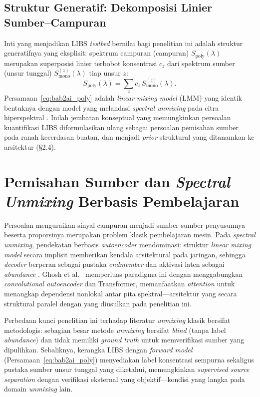 \subsection{Struktur Generatif: Dekomposisi Linier Sumber--Campuran}
Inti yang menjadikan LIBS \textit{testbed} bernilai bagi penelitian ini adalah struktur generatifnya yang eksplisit: spektrum campuran (campuran) $S_{\mathrm{poly}}(\lambda)$ merupakan superposisi linier terbobot konsentrasi $c_z$ dari spektrum sumber (unsur tunggal) $S_{\mathrm{mono}}^{(z)}(\lambda)$ tiap unsur $z$:
\begin{equation} \label{eq:bab2ai_poly}
S_{\mathrm{poly}}(\lambda) = \sum_{z} c_z \, S_{\mathrm{mono}}^{(z)}(\lambda).
\end{equation}
Persamaan~\ref{eq:bab2ai_poly} adalah \textit{linear mixing model} (LMM) yang identik bentuknya dengan model yang melandasi \textit{spectral unmixing} pada citra hiperspektral \citep{palsson_hyperspectral_2018, ghosh_hyperspectral_2022}. Inilah jembatan konseptual yang memungkinkan persoalan kuantifikasi LIBS diformulasikan ulang sebagai persoalan pemisahan sumber pada ranah kecerdasan buatan, dan menjadi \textit{prior} struktural yang ditanamkan ke arsitektur (§2.4).

\section{Pemisahan Sumber dan \textit{Spectral Unmixing} Berbasis Pembelajaran}

Persoalan menguraikan sinyal campuran menjadi sumber-sumber penyusunnya beserta proporsinya merupakan problem klasik pembelajaran mesin. Pada \textit{spectral unmixing}, pendekatan berbasis \textit{autoencoder} mendominasi: struktur \textit{linear mixing model} secara implisit memberikan kendala arsitektural pada jaringan, sehingga \textit{decoder} berperan sebagai pustaka \textit{endmember} dan aktivasi laten sebagai \textit{abundance} \citep{palsson_hyperspectral_2018}. Ghosh et al.\ \citep{ghosh_hyperspectral_2022} memperluas paradigma ini dengan menggabungkan \textit{convolutional autoencoder} dan Transformer, memanfaatkan \textit{attention} untuk menangkap dependensi nonlokal antar pita spektral---arsitektur yang secara struktural paralel dengan yang diusulkan pada penelitian ini.

Perbedaan kunci penelitian ini terhadap literatur \textit{unmixing} klasik bersifat metodologis: sebagian besar metode \textit{unmixing} bersifat \emph{blind} (tanpa label \textit{abundance}) dan tidak memiliki \textit{ground truth} untuk memverifikasi sumber yang dipulihkan. Sebaliknya, kerangka LIBS dengan \textit{forward model} (Persamaan~\ref{eq:bab2ai_poly}) menyediakan label konsentrasi sempurna sekaligus pustaka sumber unsur tunggal yang diketahui, memungkinkan \textit{supervised source separation} dengan verifikasi eksternal yang objektif---kondisi yang langka pada domain \textit{unmixing} lain.

